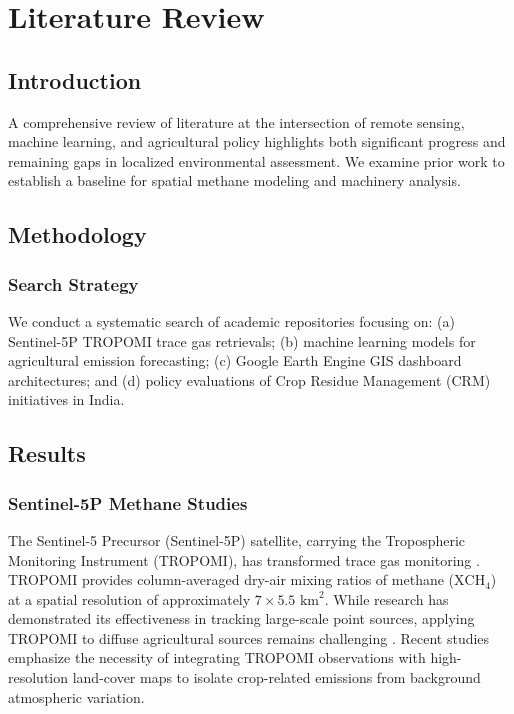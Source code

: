 \documentclass[12pt,a4paper]{report}
\begin{document}
\chapter{Literature Review}
\label{ch:lit_review}

\section{Introduction}
A comprehensive review of literature at the intersection of remote sensing, machine learning, and agricultural policy highlights both significant progress and remaining gaps in localized environmental assessment. We examine prior work to establish a baseline for spatial methane modeling and machinery analysis.

\section{Methodology}
\subsection{Search Strategy}
We conduct a systematic search of academic repositories focusing on: (a) Sentinel-5P TROPOMI trace gas retrievals; (b) machine learning models for agricultural emission forecasting; (c) Google Earth Engine GIS dashboard architectures; and (d) policy evaluations of Crop Residue Management (CRM) initiatives in India.

\section{Results}
\subsection{Sentinel-5P Methane Studies}
The Sentinel-5 Precursor (Sentinel-5P) satellite, carrying the Tropospheric Monitoring Instrument (TROPOMI), has transformed trace gas monitoring \citep{veefkind2012sentinel}. TROPOMI provides column-averaged dry-air mixing ratios of methane ($\text{XCH}_4$) at a spatial resolution of approximately $7 \times 5.5\text{ km}^2$. While research has demonstrated its effectiveness in tracking large-scale point sources, applying TROPOMI to diffuse agricultural sources remains challenging \citep{lorente2021methane, hu2018tropomi}. Recent studies emphasize the necessity of integrating TROPOMI observations with high-resolution land-cover maps to isolate crop-related emissions from background atmospheric variation.
\end{document}
